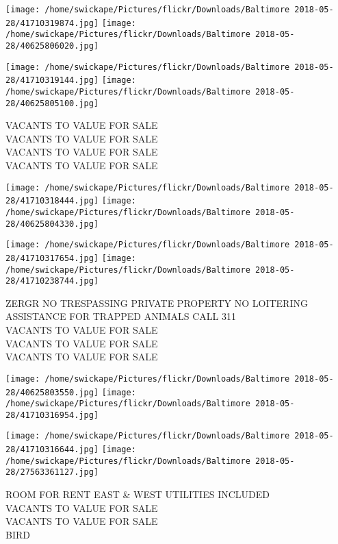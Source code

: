 \documentclass[10pt,letterpaper]{article}
\begin{document}
\texttt{[image: /home/swickape/Pictures/flickr/Downloads/Baltimore 2018-05-28/41710319874.jpg]}
\texttt{[image: /home/swickape/Pictures/flickr/Downloads/Baltimore 2018-05-28/40625806020.jpg]}

\texttt{[image: /home/swickape/Pictures/flickr/Downloads/Baltimore 2018-05-28/41710319144.jpg]}
\texttt{[image: /home/swickape/Pictures/flickr/Downloads/Baltimore 2018-05-28/40625805100.jpg]}

VACANTS TO VALUE FOR SALE\\
VACANTS TO VALUE FOR SALE\\
VACANTS TO VALUE FOR SALE\\
VACANTS TO VALUE FOR SALE\\
\pagebreak

\texttt{[image: /home/swickape/Pictures/flickr/Downloads/Baltimore 2018-05-28/41710318444.jpg]}
\texttt{[image: /home/swickape/Pictures/flickr/Downloads/Baltimore 2018-05-28/40625804330.jpg]}

\texttt{[image: /home/swickape/Pictures/flickr/Downloads/Baltimore 2018-05-28/41710317654.jpg]}
\texttt{[image: /home/swickape/Pictures/flickr/Downloads/Baltimore 2018-05-28/41710238744.jpg]}

ZERGR NO TRESPASSING PRIVATE PROPERTY NO LOITERING ASSISTANCE FOR TRAPPED ANIMALS CALL 311\\
VACANTS TO VALUE FOR SALE\\
VACANTS TO VALUE FOR SALE\\
VACANTS TO VALUE FOR SALE\\
\pagebreak

\texttt{[image: /home/swickape/Pictures/flickr/Downloads/Baltimore 2018-05-28/40625803550.jpg]}
\texttt{[image: /home/swickape/Pictures/flickr/Downloads/Baltimore 2018-05-28/41710316954.jpg]}

\texttt{[image: /home/swickape/Pictures/flickr/Downloads/Baltimore 2018-05-28/41710316644.jpg]}
\texttt{[image: /home/swickape/Pictures/flickr/Downloads/Baltimore 2018-05-28/27563361127.jpg]}

ROOM FOR RENT EAST \& WEST UTILITIES INCLUDED\\
VACANTS TO VALUE FOR SALE\\
VACANTS TO VALUE FOR SALE\\
BIRD\\
\pagebreak
\end{document}
